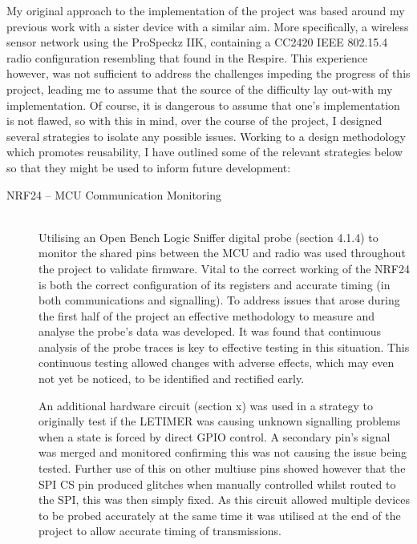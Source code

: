 My original approach to the implementation of the project was based around my
previous work with a sister device with a similar aim. More specifically, a
wireless sensor network using the ProSpeckz IIK, containing a CC2420 IEEE 802.15.4
radio configuration resembling that found in the Respire. This experience however,
was not sufficient to address the challenges impeding the progress of this project,
leading me to assume that the source of the difficulty lay out-with my implementation.
Of course, it is dangerous to assume that one's implementation is not flawed, so
with this in mind, over the course of the project, I designed several strategies
to isolate any possible issues. Working to a design methodology which promotes
reusability, I have outlined some of the relevant strategies below so that they
might be used to inform future development:
\begin{description}
  \item[\ac{NRF24} -- \ac{MCU} Communication Monitoring] \hfill \\
    Utilising an Open Bench Logic Sniffer digital probe (section {4.1.4}) to
    monitor the shared pins between the \ac{MCU} and radio was used throughout the
    project to validate firmware. Vital to the correct working of the \ac{NRF24} is
    both the correct configuration of its registers and accurate timing (in both
    communications and signalling). To address issues that arose during the first
    half of the project an effective methodology to measure and analyse the probe's
    data was developed. It was found that continuous analysis of the probe traces
    is key to effective testing in this situation. This continuous testing allowed
    changes with adverse effects, which may even not yet be noticed, to be identified
    and rectified early.
    
    An additional hardware circuit (section x) was used in a strategy to originally
    test if the \ac{LETIMER} was causing unknown signalling problems when a state is
    forced by direct \ac{GPIO} control. A secondary pin's signal was merged and
    monitored confirming this was not causing the issue being tested. Further use
    of this on other multiuse pins showed however that the \ac{SPI} \ac{CS} pin
    produced glitches when manually controlled whilst routed to the \ac{SPI},
    this was then simply fixed. As this circuit allowed multiple devices to be
    probed accurately at the same time it was utilised at the end of the project
    to allow accurate timing of transmissions.
  

\end{description}

